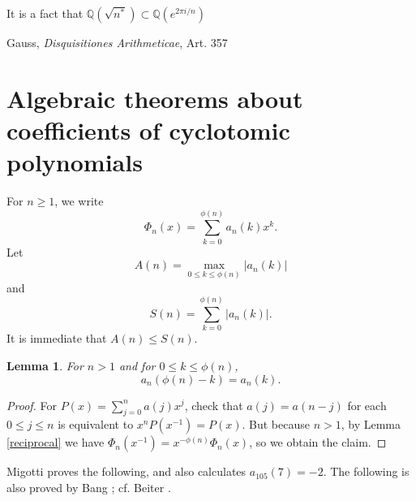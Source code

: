 \documentclass{article}
\newtheorem{lemma}[theorem]{Lemma}
\theoremstyle{definition}
\begin{document}
It is a fact that $\mathbb{Q}( \sqrt{n^*}) \subset \mathbb{Q}(e^{2\pi i/n})$ \cite[p.~19, Proposition 5.13]{kato2}









Gauss, {\em Disquisitiones Arithmeticae}, Art. 357






\section{Algebraic theorems about coefficients of cyclotomic polynomials}
For $n \geq 1$, we write 
\[
\Phi_n(x) = \sum_{k=0}^{\phi(n)} a_n(k) x^k.
\]
Let 
\[
A(n) = \max_{0 \leq k \leq \phi(n)} |a_n(k)|
\]
and
\[
S(n) = \sum_{k=0}^{\phi(n)} |a_n(k)|.
\]
It is immediate that $A(n) \leq S(n)$. 

\begin{lemma}
For $n>1$ and for $0 \leq k \leq \phi(n)$,
\[
a_n(\phi(n)-k) = a_n(k).
\]
\label{palindrome}
\end{lemma}
\begin{proof}
For $P(x) = \sum_{j=0}^n a(j) x^j$,  check that $a(j) = a(n-j)$ for each $0 \leq j \leq n$ is equivalent to
$x^n P(x^{-1}) = P(x)$.  But because $n>1$, by Lemma \ref{reciprocal} we have $\Phi_n(x^{-1})=x^{-\phi(n)} \Phi_n(x)$,
so we obtain the claim.
\end{proof}

Migotti \cite{migotti} proves the following, and also calculates $a_{105}(7)=-2$.
The following is also proved by Bang \cite{bang}; cf. Beiter \cite{beiter1964}.
\end{document}
